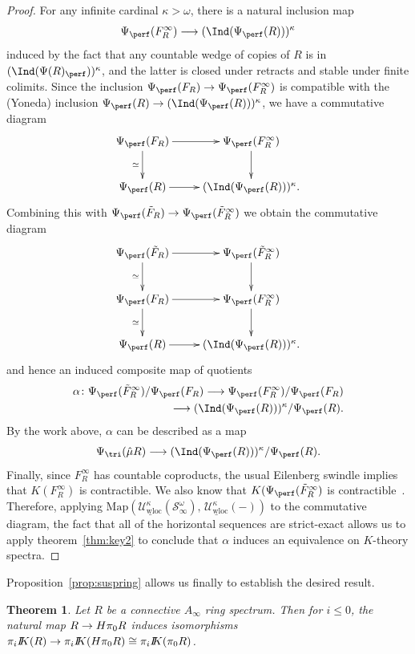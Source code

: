 \documentclass{amsart}
\newcommand{\htp}{\simeq}
\renewcommand{\to}{\mathchoice{\longrightarrow}{\rightarrow}{\rightarrow}{\rightarrow}}
\newcommand{\cU}{{\mathcal U}}
\let\catsymbfont\mathcal
\newcommand{\aS}{{\catsymbfont{S}}}
\newcommand{\bbK}{I\mspace{-6.mu}K}
\newcommand{\Map}{\mathrm{Map}}%
\newcommand{\ispec}{\aS_{\infty}}
\newcommand{\uwUloc}{\underline{\cU_{\mathrm{wloc}}^\kappa}}
\numberwithin{equation}{section}
\newtheorem{theorem}[equation]{Theorem}
\theoremstyle{definition}
\begin{document}
\begin{proof}
For any infinite cardinal $\kappa > \omega$, there is a natural
inclusion map  
\[
\Psi_{\perf}(F_R^{\infty}) \to (\Ind(\Psi_{\perf}(R)))^{\kappa} 
\]
induced by the fact that any countable wedge of copies of $R$ is in
$(\Ind(\Psi(R)_{\perf}))^{\kappa}$, and the latter is closed under 
retracts and stable under finite colimits.  Since the inclusion
$\Psi_{\perf}(F_R) \to \Psi_{\perf}(F_R^{\infty})$ is compatible
with the (Yoneda) inclusion 
$\Psi_{\perf}(R) \to (\Ind(\Psi_{\perf}(R)))^{\kappa}$, we
have a commutative diagram
\[
\xymatrix{
\Psi_{\perf}(F_R) \ar[r] \ar[d]_-{\htp} & \Psi_{\perf}(F_R^{\infty}) \ar[d] \\
\Psi_{\perf}(R) \ar[r] & (\Ind(\Psi_{\perf}(R)))^{\kappa}. 
}
\]
Combining this with $\Psi_{\perf}(\tilde{F}_R)\to\Psi_{\perf}(\tilde{F}^\infty_R)$ we obtain the commutative diagram
\begin{equation}\label{varsusp}
\xymatrix{
\Psi_{\perf}(\tilde{F}_R) \ar[r] \ar[d]_-{\htp}
& \Psi_{\perf}(\tilde{F}_R^{\infty}) \ar[d] \\
\Psi_{\perf}(F_R) \ar[r] \ar[d]_-{\htp} & \Psi_{\perf}(F_R^{\infty}) \ar[d] \\
\Psi_{\perf}(R) \ar[r] & (\Ind(\Psi_{\perf}(R)))^{\kappa}. 
}
\end{equation}
and hence an induced composite map of quotients 
\begin{align*}
\alpha \colon \Psi_{\perf}(\tilde{F}_R^{\infty})
/ \Psi_{\perf}(F_R) \to \Psi_{\perf}(F_R^{\infty})
/ \Psi_{\perf}(F_R) \\ \to
(\Ind(\Psi_{\perf}(R)))^{\kappa} / \Psi_{\perf}(R). 
\end{align*}
By the work above, $\alpha$ can be described as a map
\[
\Psi_{\tri}(\hat{\mu} R) \to
(\Ind(\Psi_{\perf}(R)))^{\kappa} / \Psi_{\perf}(R).
\]
Finally, since $F_R^{\infty}$ has countable coproducts, the usual
Eilenberg swindle implies that $K(F_R^{\infty})$ is contractible.
We also know that $K(\Psi_{\perf}(\tilde{F}_R^{\infty})$
is contractible~\cite[6.1,6.3]{noncondeloop}.  Therefore, applying
$\Map(\uwUloc(\ispec^\omega),\,\uwUloc(-))$ to the 
commutative diagram, the fact that all of the horizontal sequences are
strict-exact allows us to apply 
theorem~\ref{thm:key2} to conclude that $\alpha$ induces an
equivalence on $K$-theory spectra.
\end{proof}

Proposition~\ref{prop:suspring} allows us finally to establish the
desired result.

\begin{theorem}\label{thm:nonconnKconn}
Let $R$ be a connective $A_\infty$ ring spectrum.  Then for $i \leq
0$, the natural map $R \to H\pi_0 R$ induces isomorphisms
$\pi_i \bbK(R) \to \pi_i \bbK(H\pi_0 R) \cong \pi_i \bbK(\pi_0R)$.
\end{theorem}
\end{document}

